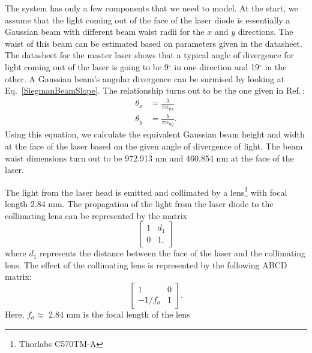 The system has only a few components that we need to model. At the start, we assume that the light coming out of the face of the laser diode is essentially a Gaussian beam with different beam waist radii for the $x$ and $y$ directions. The waist of this beam can be estimated based on parameters given in the datasheet. The datasheet for the master laser shows that a typical angle of divergence for light coming out of the laser is going to be 9$^\circ$ in one direction and 19$^\circ$ in the other. A Gaussian beam's angular divergence can be surmised by looking at Eq.\ \ref{SiegmanBeamSlope}. The relationship turns out to be the one given in Ref.\,\cite{MellesGriotGaussian}:
\begin{align}
\theta_{x} &= \frac{\lambda}{\pi w_{0x}}\\
\theta_{y} &= \frac{\lambda}{\pi w_{0y}}.
\end{align}  
Using this equation, we calculate the equivalent Gaussian beam height and width at the face of the laser based on the given angle of divergence of light. The beam waist dimensions turn out to be 972.913 nm and 460.854 nm at the face of the laser.

The light from the laser head is emitted and collimated by a lens\footnote{Thorlabs C570TM-A} with focal length 2.84 mm.  %
The propagation of the light from the laser diode to the collimating lens can be represented by the matrix
\begin{equation}
\begin{bmatrix}\label{ABCD1}
1 & d_1 \\ 0 & 1,
\end{bmatrix}
\end{equation}
where $d_1$ represents the distance between the face of the laser and the collimating lens. The effect of the collimating lens is represented by the following ABCD matrix:
\begin{equation}
\begin{bmatrix}\label{ABCD2}
1 & 0 \\ -1/f_{a} & 1
\end{bmatrix}.
\end{equation}
Here, $f_a\approx$ 2.84 mm is the focal length of the lens

